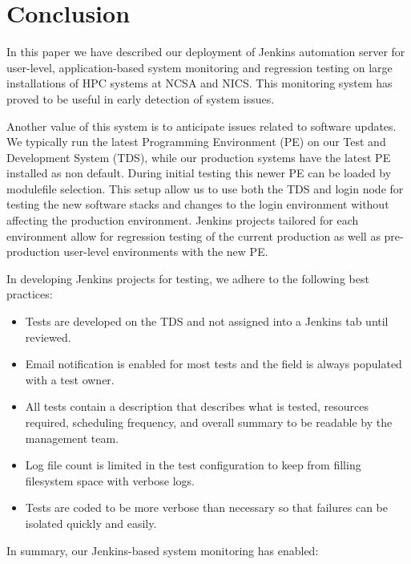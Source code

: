 \documentclass[10pt, conference, compsocconf]{IEEEtran}
\begin{document}
\section{Conclusion}
\label{sec:Conclusion}

In this paper we have described our deployment of Jenkins automation server for user-level, application-based system monitoring and regression testing on large installations of HPC systems at NCSA and NICS. 
This monitoring system has proved to be useful in early detection of system issues. 

Another value of this system is to anticipate issues related to software updates. 
We typically run the latest Programming Environment (PE) on our Test and Development System (TDS), while our production systems have the latest PE installed as non default. 
During initial testing this newer PE can be loaded by modulefile selection. This setup allow us to use both the TDS and login node for testing the new software stacks and changes to the login environment without affecting the production environment. 
Jenkins projects tailored for each environment allow for regression testing of the current production as well as pre-production user-level environments with the new PE.

In developing Jenkins projects for testing, we adhere to the following best practices: 
\begin{itemize}
\item Tests are developed on the TDS and not assigned into a Jenkins tab until reviewed. 
\item Email notification is enabled for most tests and the field is always populated with a test owner.
\item All tests contain a description that describes what is tested, resources required, scheduling frequency, and overall summary  to be readable by the management team.
\item Log file count is limited in the test configuration to keep from filling filesystem space with verbose logs.
\item Tests are coded to be more verbose than necessary so that failures can be isolated quickly and easily.
\end{itemize}

In summary, our Jenkins-based system monitoring has enabled: 
\end{document}
